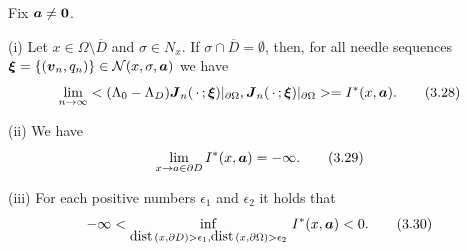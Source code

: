   Fix $\mbox{\boldmath $a$}\not=\mbox{\boldmath $0$}$.


\noindent
(i)  Let $x\in\Omega\setminus\overline{D}$ and $\sigma\in N_x$.
If $\sigma\cap\overline{D}=\emptyset$, then,
for all needle sequences $\mbox{\boldmath $\xi$}=\{(\mbox{\boldmath $v$}_n,q_n)\}\in{\cal N}(x,\sigma,\mbox{\boldmath $a$})$ we have
$$\displaystyle
\lim_{n\rightarrow\infty}
<(\Lambda_0-\Lambda_D)\mbox{\boldmath $J$}_n(\,\cdot\,;\mbox{\boldmath $\xi$})\vert_{\partial\Omega},
\mbox{\boldmath $J$}_n(\,\cdot\,;\mbox{\boldmath $\xi$})\vert_{\partial\Omega}>
=I^*(x,\mbox{\boldmath $a$}).
\tag {3.28}
$$




\noindent
(ii)  We have
$$\displaystyle
\lim_{x\rightarrow a\in\partial D}I^*(x,\mbox{\boldmath $a$})=-\infty.
\tag {3.29}
$$


\noindent
(iii)  For each positive numbers $\epsilon_1$ and $\epsilon_2$ it holds that
$$\displaystyle
-\infty<\inf_{\text{dist}\,(x,\partial D)>\epsilon_1, \text{dist}\,(x,\partial\Omega)>\epsilon_2}\,I^*(x,\mbox{\boldmath $a$})<0.
\tag {3.30}
$$








